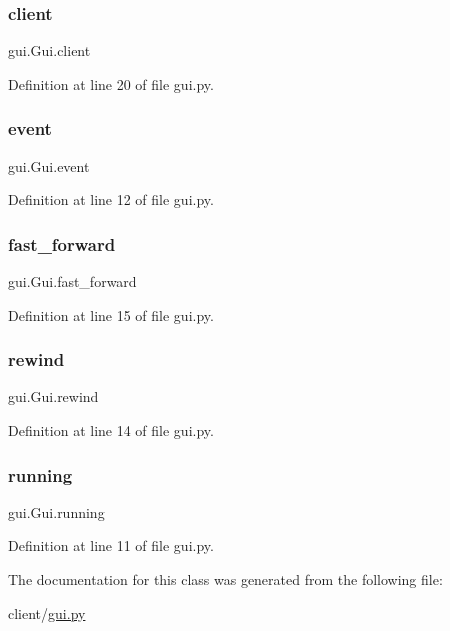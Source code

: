 \subsubsection{\texorpdfstring{client}{client}}
{\footnotesize\ttfamily gui.\+Gui.\+client}



Definition at line 20 of file gui.\+py.

\mbox{\label{classgui_1_1_gui_a89e54e88320f796bada4f5eda88d422d}} 
\subsubsection{\texorpdfstring{event}{event}}
{\footnotesize\ttfamily gui.\+Gui.\+event}



Definition at line 12 of file gui.\+py.

\mbox{\label{classgui_1_1_gui_a6be21c3e5b8c9d9c4296b22c88dfc5c5}} 
\subsubsection{\texorpdfstring{fast\_forward}{fast\_forward}}
{\footnotesize\ttfamily gui.\+Gui.\+fast\+\_\+forward}



Definition at line 15 of file gui.\+py.

\mbox{\label{classgui_1_1_gui_a67e330dafa5f5a20b707ceeca1d22d1b}} 
\subsubsection{\texorpdfstring{rewind}{rewind}}
{\footnotesize\ttfamily gui.\+Gui.\+rewind}



Definition at line 14 of file gui.\+py.

\mbox{\label{classgui_1_1_gui_a758ab9c1a5bf959018bc51324e74471b}} 
\subsubsection{\texorpdfstring{running}{running}}
{\footnotesize\ttfamily gui.\+Gui.\+running}



Definition at line 11 of file gui.\+py.



The documentation for this class was generated from the following file\+:\begin{DoxyCompactItemize}
\item 
client/\mbox{\hyperlink{gui_8py}{gui.\+py}}\end{DoxyCompactItemize}
